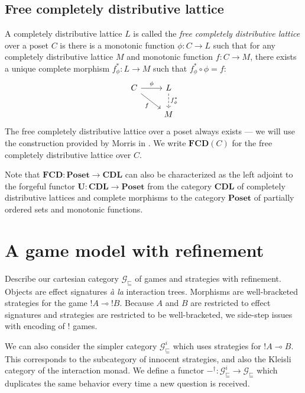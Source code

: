 \documentclass[format=sigplan,authordraft]{acmart}
\newcommand{\gcat}{\mathcal{G}_{\sqsubseteq}}
\begin{document}
\subsection{Free completely distributive lattice} %

A completely distributive lattice $L$ is called the
\emph{free completely distributive lattice}
over a poset $C$ is there is
a monotonic function $\phi : C \rightarrow L$
such that
for any completely distributive lattice $M$
and monotonic function $f : C \rightarrow M$,
there exists a unique complete morphism $f^*_\phi : L \rightarrow M$
such that $f^*_\phi \circ \phi = f$:
\[
  \begin{tikzcd}
    C \arrow[r, "\phi"] \arrow[rd, "f"'] &
    L \arrow[d, "f^*_\phi", dashed] \\ & M
  \end{tikzcd}
\]
The free completely distributive lattice over a poset
always exists ---
we will use the construction provided by
Morris in \cite{augtyp}.
We write $\mathbf{FCD}(C)$ for
the free completely distributive lattice over $C$.

Note that $\mathbf{FCD} : \mathbf{Poset} \rightarrow \mathbf{CDL}$
can also be characterized as
the left adjoint to the forgeful functor
$\mathbf{U} : \mathbf{CDL} \rightarrow \mathbf{Poset}$
from the category $\mathbf{CDL}$
of completely distributive lattices and complete morphisms
to the category $\mathbf{Poset}$
of partially ordered sets and monotonic functions.



\section{A game model with refinement} %

Describe our cartesian category $\gcat$
of games and strategies with refinement.
Objects are effect signatures \emph{\`a la} interaction trees.
Morphisms are well-bracketed strategies for
the game ${!A} \multimap {!B}$.
Because $A$ and $B$ are restricted to effect signatures and
strategies are restricted to be well-bracketed,
we side-step issues with encoding of $!$ games.

We can also consider the simpler category
$\gcat^i$
which uses strategies for ${!A} \multimap B$.
This corresponds to the subcategory of innocent strategies,
and also the Kleisli category of the interaction monad.
We define a functor
$-^\dagger : \gcat^i \rightarrow \gcat$
which duplicates the same behavior
every time a new question is received.
\end{document}

